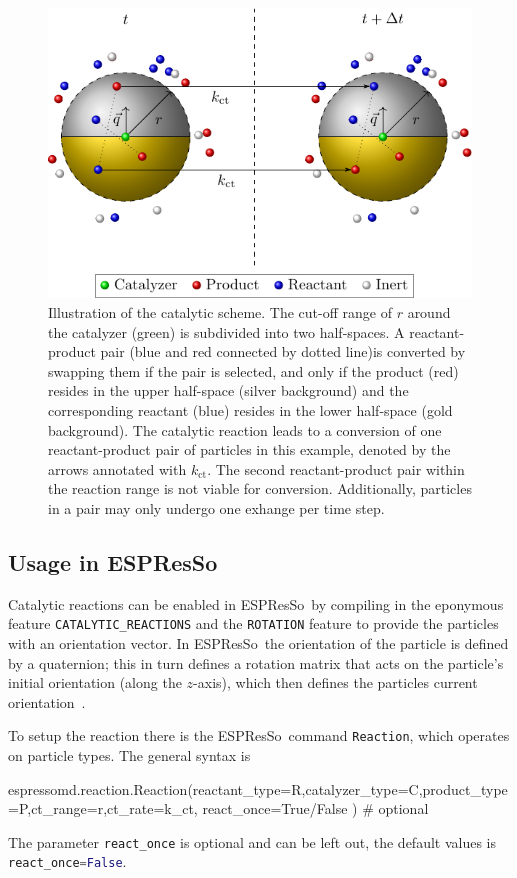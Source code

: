 \documentclass[aip,jcp,reprint,a4paper,onecolumn,nofootinbib,amsmath,amssymb]{revtex4-1}
\newcommand\code{\lstinline}
\newcommand{\es}{\mbox{\textsf{ESPResSo}}\xspace}
\newcommand\codees{\lstinline[language=python]}
\begin{document}
\begin{figure}
  \centering
  \includegraphics{FIGURES/number-conserving}
  \caption{\label{fig:nc}Illustration of the catalytic scheme. The cut-off range of $r$ around the catalyzer (green) is subdivided into two half-spaces. A reactant-product pair (blue and red connected by dotted line)is converted by swapping them if the pair is selected, and only if the product (red) resides in the upper half-space (silver background) and the corresponding reactant (blue) resides in the lower half-space (gold background). The catalytic reaction leads to a conversion of one reactant-product pair of particles in this example, denoted by the arrows annotated with $k_{\text{ct}}$. The second reactant-product pair within the reaction range is not viable for conversion. Additionally, particles in a pair may only undergo one exhange per time step.}
\end{figure}

\subsection{Usage in \es}

Catalytic reactions can be enabled in \es\ by compiling in the eponymous feature \code{CATALYTIC_REACTIONS} and the \code{ROTATION} feature to provide the particles with an orientation vector. In \es\ the orientation of the particle is defined by a quaternion; this in turn defines a rotation matrix that acts on the particle's initial orientation (along the $z$-axis), which then defines the particles current orientation~\cite{UG,Limbach_06,Arnold_13}.

To setup the reaction there is the \es\ command \codees{Reaction}, which operates on particle types. The general syntax is
\begin{espresso}
espressomd.reaction.Reaction(reactant_type=R,catalyzer_type=C,product_type=P,ct_range=r,ct_rate=k_ct,
                                react_once=True/False ) # optional
\end{espresso}
The parameter \codees{react_once} is optional and can be left out, the default values is \codees{react_once=False}.
\end{document}
